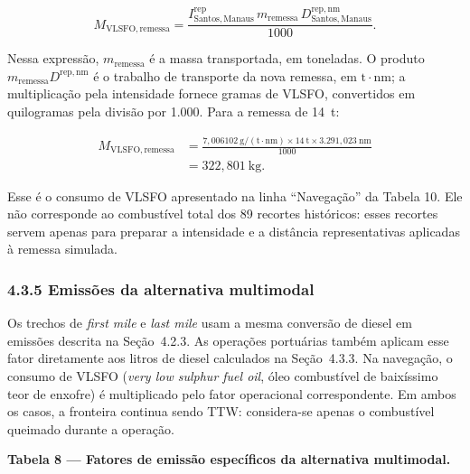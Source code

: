 \documentclass[brazil,]{article}
\let\oldsubsubsection\subsubsection
\renewcommand{\subsubsection}{\Needspace{10\baselineskip}\oldsubsubsection}
\newcommand{\keeptable}{\Needspace{0.64\textheight}}
\begin{document}
\[
M_{\mathrm{VLSFO,remessa}}
=\frac{
I_{\mathrm{Santos,Manaus}}^{\mathrm{rep}}\,
m_{\mathrm{remessa}}\,
D_{\mathrm{Santos,Manaus}}^{\mathrm{rep,nm}}
}{1000}.
\]

Nessa expressão, \(m_{\mathrm{remessa}}\) é a massa transportada, em
toneladas. O produto
\(m_{\mathrm{remessa}}D^{\mathrm{rep,nm}}\) é o trabalho de transporte
da nova remessa, em \(\mathrm{t\cdot nm}\); a multiplicação pela
intensidade fornece gramas de VLSFO, convertidos em quilogramas pela
divisão por 1.000. Para a remessa de 14~t:

\[
\begin{aligned}
M_{\mathrm{VLSFO,remessa}}
&=\frac{
7{,}006102\ \mathrm{g/(t\cdot nm)}
\times14\ \mathrm{t}
\times3.291{,}023\ \mathrm{nm}
}{1000}\\
&=322{,}801\ \mathrm{kg}.
\end{aligned}
\]

Esse é o consumo de VLSFO apresentado na linha ``Navegação'' da Tabela
10. Ele não corresponde ao combustível total dos 89 recortes históricos:
esses recortes servem apenas para preparar a intensidade e a distância
representativas aplicadas à remessa simulada.

\hypertarget{emissuxf5es-da-alternativa-multimodal}{%
\subsubsection{4.3.5 Emissões da alternativa
multimodal}\label{emissuxf5es-da-alternativa-multimodal}}

Os trechos de \emph{first mile} e \emph{last mile} usam a mesma
conversão de diesel em emissões descrita na Seção~4.2.3. As operações
portuárias também aplicam esse fator diretamente aos litros de diesel
calculados na Seção~4.3.3. Na navegação, o consumo de VLSFO (\emph{very
low sulphur fuel oil}, óleo combustível de baixíssimo teor de enxofre) é
multiplicado pelo fator operacional correspondente. Em ambos os casos, a
fronteira continua sendo TTW: considera-se apenas o combustível queimado
durante a operação.

\keeptable
\textbf{Tabela 8 --- Fatores de emissão específicos da alternativa
multimodal.}
\end{document}
